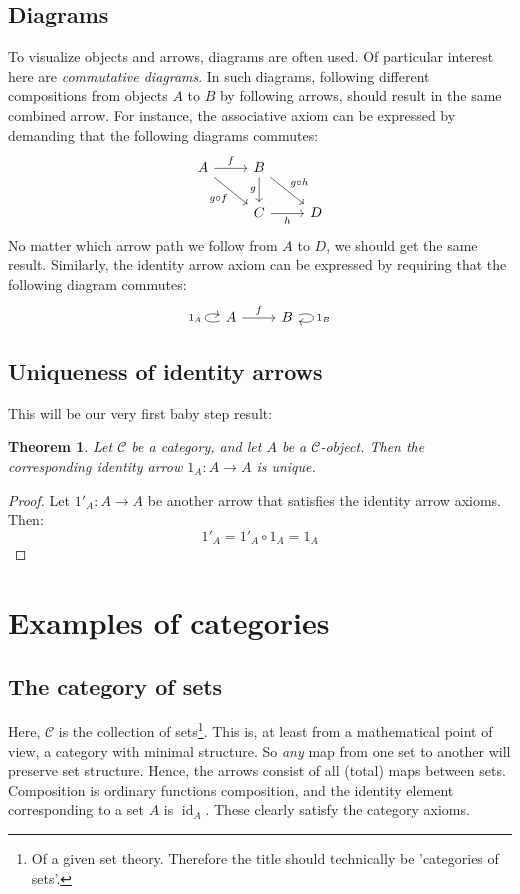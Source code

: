 \documentclass[12pt, a4paper]{article}
\newtheorem{theorem}{Theorem}[section]
\numberwithin{equation}{section}
\DeclareMathOperator{\id}{id}
\begin{document}
\subsection{Diagrams}
To visualize objects and arrows, diagrams are often used. Of particular interest here are \textit{commutative diagrams}. In such diagrams, following different compositions from objects $A$ to $B$ by following arrows, should result in the same combined arrow. For instance, the associative axiom can be expressed by demanding that the following diagrams commutes:
\begin{equation*}
\begin{tikzcd}
A\arrow[r, "f"]
\arrow[dr, swap, "g\circ f"]
&
B\arrow[dr, "g\circ h"]
\arrow[d, swap, "g"]
\\
{}&
C\arrow[r, swap, "h"]
&
D
\end{tikzcd}
\end{equation*}
No matter which arrow path we follow from $A$ to $D$, we should get the same result. Similarly, the identity arrow axiom can be expressed by requiring that the following diagram commutes:
\begin{equation*}
\begin{tikzcd}
A\arrow[r, "f"]
\arrow[loop left,"1_A"] &
B\arrow[loop right,"1_B"]
\end{tikzcd}
\end{equation*}

\subsection{Uniqueness of identity arrows}
This will be our very first baby step result:
\begin{theorem}
Let $\mathcal{C}$ be a category, and let $A$ be a $\mathcal{C}$-object. Then the corresponding identity arrow $1_A: A\rightarrow A$ is unique.
\end{theorem}
\begin{proof}
Let $1'_A: A\rightarrow A$ be another arrow that satisfies the identity arrow axioms. Then:
\begin{equation}
1'_A=1'_A\circ 1_A=1_A
\end{equation}
\end{proof}

\section{Examples of categories}

\subsection{The category of sets}
Here, $\mathcal{C}$ is the collection of sets\footnote{Of a given set theory. Therefore the title should technically be 'categories of sets'.}. This is, at least from a mathematical point of view, a category with minimal structure. So \textit{any} map from one set to another will preserve set structure. Hence, the arrows consist of all (total) maps between sets. Composition is ordinary functions composition, and the identity element corresponding to a set $A$ is $\id_A$. These clearly satisfy the category axioms.
\end{document}

